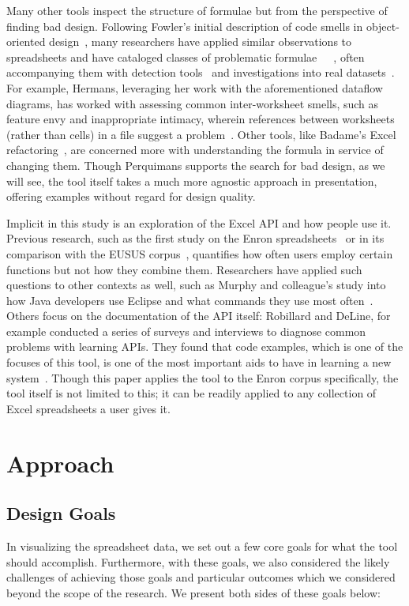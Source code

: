 \documentclass[conference]{IEEEtran}
\newcommand{\toolname}{Perquimans\xspace} \newcommand{\toolnameend}{Perquimans}
\begin{document}
	Many other tools inspect the structure of formulae but from the
	perspective of finding bad design.  Following Fowler's initial description of
	code smells in object-oriented design~\cite{fowler2009refactoring}, many
	researchers have applied similar observations to spreadsheets and have
	cataloged classes of problematic
	formulae~\cite{hermans2012detecting}~\cite{cunha2012towards}~\cite{asavametha2012detecting}, often accompanying them with detection tools~\cite{abreu2014smelling} and investigations into real datasets~\cite{jansen2015code}. For example, Hermans, leveraging her work with the aforementioned dataflow diagrams, has worked with assessing common inter-worksheet smells, such as feature envy and inappropriate intimacy, wherein references between worksheets (rather than cells) in a file suggest a problem~\cite{hermans2012detectinginter}. Other tools, like Badame's Excel refactoring~\cite{badame2012refactoring}, are concerned more with understanding the formula in service of changing them. Though \toolname supports the search for bad design, as we will see, the tool itself takes a much more agnostic approach in presentation, offering examples without regard for design quality.

	Implicit in this study is an exploration of the Excel API and how people use
	it. Previous research, such as the first study on the Enron
	spreadsheets~\cite{hermans2015enron} or in its comparison with the EUSUS
	corpus~\cite{jansen2015enron}, quantifies how often users employ certain
	functions but not how they combine them. Researchers have applied such
	questions to other contexts as well, such as Murphy and colleague's study into
	how Java developers use Eclipse and what commands they use most
	often~\cite{murphy2006java}. Others focus on the documentation of the API
	itself: Robillard and DeLine, for example conducted a series of surveys and
	interviews to diagnose common problems with learning APIs. They found that
	code examples, which is one of the focuses of this tool, is one of the most important
	aids to have in learning a new system~\cite{robillard2011field}. Though this
	paper applies the tool to the Enron corpus specifically, the tool itself is not
	limited to this; it can be readily applied to any collection of Excel
	spreadsheets a user gives it.
	
	\section{Approach}
	
	\subsection{Design Goals} \label{goals} In visualizing the spreadsheet data, we
	set out a few core goals for what the tool should accomplish. Furthermore, with
	these goals, we also considered the likely challenges of achieving those goals
	and particular outcomes which we considered beyond the scope of the research.
	We present both sides of these goals below:
	
\end{document}

